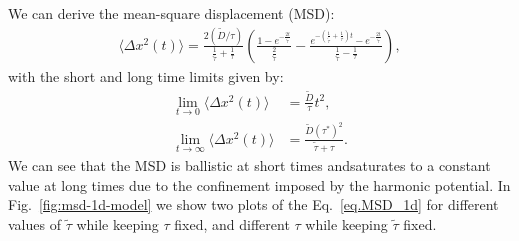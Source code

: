 \documentclass[%
10pt,
superscriptaddress,
twocolumn,
 amsmath,amssymb,
 aps,prx,
]{revtex4-2}
\begin{document}
We can derive the mean-square displacement (MSD):
%
\begin{align}
    \label{eq.MSD_1d}
    \langle \Delta x^2(t)\rangle = \frac{2(\tilde{D}/\tau)}{\frac{1}{\tilde{\tau}}+\frac{1}{\tau}}\left(\frac{1-e^{-\frac{2t}{\tilde{\tau}}}}{\frac{2}{\tilde{\tau}}}-\frac{e^{-(\frac{1}{\tilde{\tau}}+\frac{1}{\tau})t}-e^{-\frac{2t}{\tilde{\tau}}}}{\frac{1}{\tilde{\tau}}-\frac{1}{\tau}}\right),
\end{align}
%
with the short and long time limits given by:
%
\begin{align}
    \label{eq.limits}
    \lim_{t\to0} \langle \Delta x^2(t)\rangle & = \frac{\tilde{D}}{\tau}t^2,\\
    \lim_{t\to\infty} \langle \Delta x^2(t)\rangle & =\frac{\tilde{D}(\tau^*)^2}{\tilde{\tau}+\tau}.
\end{align}
%
We can see that the MSD is ballistic at short times andsaturates to a constant value at long times due to the confinement imposed by the harmonic potential. In Fig.~\ref{fig:msd-1d-model} we show two plots of the Eq.~\ref{eq.MSD_1d} for different values of $\tilde{\tau}$ while keeping $\tau$ fixed, and different $\tau$ while keeping $\tilde{\tau}$ fixed.
\end{document}
